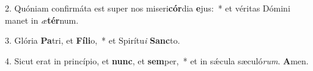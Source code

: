 2. Quóniam confirmáta est super nos miseri\textbf{cór}dia \textbf{e}jus:~*  et véritas Dómini manet in \textit{æ}\textbf{tér}num.\

3. Glória \textbf{Pa}tri, et \textbf{Fí}\textbf{li}o,~*  et Spirítu\textit{i} \textbf{Sanc}to.\

4. Sicut erat in princípio, et \textbf{nunc}, et \textbf{sem}per,~*  et in sǽcula sæculó\textit{rum}. \textbf{A}men.\

